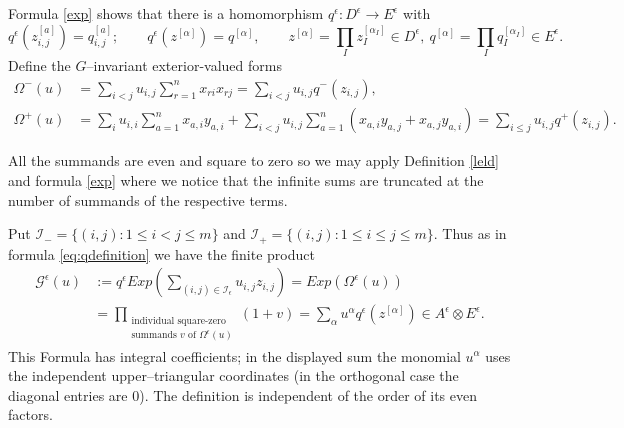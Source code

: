\documentclass[10pt]{amsart}
\theoremstyle{definition}
\theoremstyle{remark}
\begin{document}
 Formula \eqref{exp}  shows that there is a homomorphism  $q^\epsilon:D^\epsilon\to  E^\epsilon$ with \begin{equation}\label{eq:classical-q-definition}q^\epsilon(z_{i,j}^{[a]})=q_{i,j}^{[a]};\qquad  
 q^\epsilon(z^{[\alpha]})=q^{[\alpha]},
 \qquad z^{[\alpha]}=\prod_I z_I^{[\alpha_I]}\in D^\epsilon,\ q^{[\alpha]}=\prod_I q_I^{[\alpha_I]}\in E^\epsilon.
\end{equation}Define the $G$--invariant exterior-valued forms
\begin{align}
 \Omega^-(u)&=\sum_{i<j}u_{i,j}\sum_{r=1}^nx_{ri}x_{rj}=\sum_{i<j}u_{i,j}q^{ -}(z_{i,j}),
 \label{eq:classical-omega-minus}\\
 \Omega^+(u)&= \sum_i u_{i,i}\sum_{a=1}^nx_{a,i}y_{a,i}
       +\sum_{i<j}u_{i,j}\sum_{a=1}^n(x_{a,i}y_{a,j}+x_{a,j}y_{a,i})=\sum_{i\leq j}u_{i,j}q^{ +}(z_{i,j}) .
 \label{eq:classical-omega-plus}
\end{align}


All the summands are even and square to zero so we may apply Definition \ref{leld} and formula \eqref{exp}  where we notice that the infinite sums  are truncated at the number of summands of the respective terms. \smallskip



Put $\mathcal I_- =\{(i,j):1\leq i<j\leq m\}$ and $\mathcal I_+=\{(i,j):1\leq i\leq j\leq m\}$. Thus as in formula \eqref{eq:qdefinition} we have the finite product
\begin{equation}\label{eq:classical-generating-product}
\begin{aligned}
 \mathcal G^\epsilon(u)&:=q^\epsilon Exp\left(\sum_{(i,j)\in\mathcal I_\epsilon}u_{i,j}z_{i,j}\right)=Exp(\Omega^\epsilon(u))\\
 &=\prod_{\substack{\text{individual square-zero}\\\text{summands }v\text{ of }\Omega^\epsilon(u)}}(1+v)
 =\sum_\alpha u^\alpha q^\epsilon(z^{[\alpha]})\in A^\epsilon\otimes E^\epsilon.
\end{aligned}
\end{equation}  This Formula  
has integral coefficients; in the displayed sum the monomial $u^\alpha$
uses the independent upper--triangular coordinates (in the orthogonal case the diagonal entries are 0).  The definition is
independent of the order of its even factors.  
\end{document}
